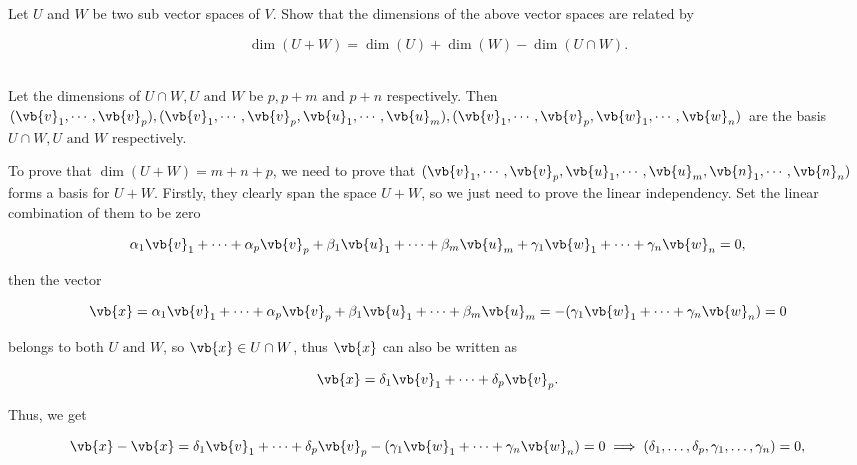 \documentclass[a4paper,12pt]{report}
\begin{document}
{Let \(U\) and \(W\) be two sub vector spaces of \(V\). Show that the dimensions of the above vector spaces are related by

\begin{equation}
    \dim (U+W) = \dim (U) + \dim (W) - \dim (U \cap W).
\end{equation}~
}
{Let the dimensions of \(U \cap W, U \text { and } W\) be \(p, p+m \text { and } p+n\) respectively. Then \((\vb{v}_1, \cdots, \vb{v}_p), (\vb{v}_1, \cdots, \vb{v}_p, \vb{u}_1, \cdots, \vb{u}_m), (\vb{v}_1, \cdots, \vb{v}_p, \vb{w}_1, \cdots, \vb{w}_n)\) are the basis \(U \cap W, U \text { and } W\) respectively.

To prove that \(\dim (U+W) = m+n+p\), we need to prove that \((\vb{v}_1, \cdots, \vb{v}_p, \vb{u}_1, \cdots, \vb{u}_m, \vb{n}_1, \cdots, \vb{n}_n)\) forms a basis for \(U+W\). Firstly, they clearly span the space \(U+W\), so we just need to prove the linear independency. Set the linear combination of them to be zero

\begin{equation}
    \alpha _{1}\vb{v} _{1} + \cdots + \alpha _{p}\vb{v} _{p} + \beta _{1}\vb{u} _{1} + \cdots + \beta _{m} \vb{u} _{m} + \gamma _{1} \vb{w} _{1} + \cdots + \gamma _{n} \vb{w} _{n} = 0,             
\end{equation}

then the vector 

\begin{equation}
    \vb{x} =  \alpha _{1}\vb{v} _{1} + \cdots + \alpha _{p}\vb{v} _{p} + \beta _{1}\vb{u} _{1} + \cdots + \beta _{m} \vb{u} _{m} = -(\gamma _{1} \vb{w} _{1} + \cdots + \gamma _{n} \vb{w} _{n}) = 0
\end{equation}

belongs to both \(U \text { and } W\), so \(\vb{x} \in U \cap W\), thus \(\vb{x} \) can also be written as

\begin{equation}
    \vb{x} = \delta _{1}\vb{v} _{1} + \cdots + \delta _{p}\vb{v} _{p}.    
\end{equation}

Thus, we get

\begin{equation}
    \vb{x} - \vb{x} = \delta _{1}\vb{v} _{1} + \cdots + \delta _{p}\vb{v} _{p} -(\gamma _{1} \vb{w} _{1} + \cdots + \gamma _{n} \vb{w} _{n}) = 0 \implies (\delta _{1}, \ldots , \delta _{p}, \gamma _{1}, \ldots ,\gamma _{n}    ) = 0,
\end{equation}

}
\end{document}
